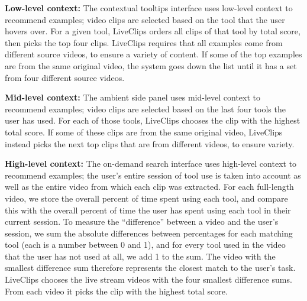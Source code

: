 \textbf{Low-level context:} The contextual tooltips interface uses low-level context to recommend examples; video clips are selected based on the tool that the user hovers over. For a given tool, LiveClips orders all clips of that tool by total score, then picks the top four clips. LiveClips requires that all examples come from different source videos, to ensure a variety of content. If some of the top examples are from the same original video, the system goes down the list until it has a set from four different source videos. %

\textbf{Mid-level context:} The ambient side panel uses mid-level context to recommend examples; video clips are selected based on the last four tools the user has used. For each of those tools, LiveClips chooses the clip with the highest total score. If some of these clips are from the same original video, LiveClips instead picks the next top clips that are from different videos, to ensure variety.

\textbf{High-level context:} The on-demand search interface uses high-level context to recommend examples; the user's entire session of tool use is taken into account as well as the entire video from which each clip was extracted. %
For each full-length video, we store the overall percent of time spent using each tool, and compare this with the overall percent of time the user has spent using each tool in their current session. To measure the ``difference'' between a video and the user's session, we sum the absolute differences between percentages for each matching tool (each is a number between 0 and 1), and for every tool used in the video that the user has not used at all, we add 1 to the sum. The video with the smallest difference sum therefore represents the closest match to the user's task. LiveClips chooses the live stream videos with the four smallest difference sums. From each video it picks the  clip with the highest total score.%

